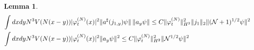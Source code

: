\documentclass[11pt,a4paper]{article}
\newtheorem{lemma}[thm]{Lemma}
\newcommand{\cN}{{\cal N}}
\begin{document}
\begin{lemma}
\begin{equation}
\begin{split}
 \int dx dy N^3 V(N (x-y))& |\varphi_t^{(N)} (x)|^2  \| a^\sharp (j_{1,y}) \psi \| \, \| a_y \psi \| \leq C\| \varphi_t^{(N)} \|_{H^2}^2 \| j_1 \|_2 \| (\cN+1)^{1/2} \psi \|^2 \\
\int dx dy N^3 V(N (x-y)) &|\varphi_t^{(N)} (x)|^2 \| a_y \psi \|^2 \leq C \| \varphi_t^{(N)} \|_{H^2}^2 \| \cN^{1/2} \psi \|^2
\end{split} \end{equation}
\end{lemma}
\end{document}
